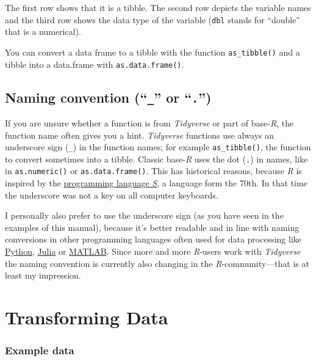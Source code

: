 \documentclass[
]{scrartcl}
\makeatletter
\newenvironment{kframe}{%
\medskip{}
\setlength{\fboxsep}{.8em}
 \def\at@end@of@kframe{}%
 \ifinner\ifhmode%
  \def\at@end@of@kframe{\end{minipage}}%
  \begin{minipage}{\columnwidth}%
 \fi\fi%
 \def\FrameCommand##1{\hskip\@totalleftmargin \hskip-\fboxsep
 \colorbox{shadecolor}{##1}\hskip-\fboxsep
     \hskip-\linewidth \hskip-\@totalleftmargin \hskip\columnwidth}%
 \MakeFramed {\advance\hsize-\width
   \@totalleftmargin\z@ \linewidth\hsize
   \@setminipage}}%
 {\par\unskip\endMakeFramed%
 \at@end@of@kframe}
\newenvironment{rmdblock}[1]
  {
  \begin{itemize}
  \renewcommand{\labelitemi}{
    \raisebox{-.7\height}[0pt][0pt]{
      {\setkeys{Gin}{width=3em,keepaspectratio}\texttt{[image: images/\#1]}}
    }
  }
  \setlength{\fboxsep}{1em}
  \begin{kframe}
  \item
  }
  {
  \end{kframe}
  \end{itemize}
  }
\newenvironment{geek}
    {\begin{rmdblock}{geek}}
    {\end{rmdblock}}
\makeatother
\begin{document}
The first row shows that it is a tibble. The second row depicts the variable names and the third row shows the data type of the variable (\texttt{dbl} stands for ``double'' that is a numerical).

\begin{geek}
You can convert a data frame to a tibble with the function
\texttt{as\_tibble()} and a tibble into a data.frame with
\texttt{as.data.frame()}.
\end{geek}

\subsection{\texorpdfstring{Naming convention (``\texttt{\_}'' or ``\texttt{.}'')}{Naming convention (``\_'' or ``.'')}}\label{naming-convention-_-or-.}

If you are unsure whether a function is from \emph{Tidyverse} or part of base-\emph{R}, the function name often gives you a hint. \emph{Tidyverse} functions use always an underscore sign (\texttt{\_}) in the function names; for example \texttt{as\_tibble()}, the function to convert sometimes into a tibble. Classic base-\emph{R} uses the dot (\texttt{.}) in names, like in \texttt{as.numeric()} or \texttt{as.data.frame()}. This has historical reasons, because \emph{R} is inspired by the \href{https://en.wikipedia.org/wiki/S_(programming_language)}{programming language \emph{S}}, a language form the 70th. In that time the underscore was not a key on all computer keyboards.

I personally also prefer to use the underscore sign (as you have seen in the examples of this manual), because it's better readable and in line with naming conversions in other programming languages often used for data processing like \href{https://www.python.org/}{Python}, \href{https://julialang.org/}{Julia} or \href{https://en.wikipedia.org/wiki/MATLAB}{MATLAB}. Since more and more \emph{R}-users work with \emph{Tidyverse} the naming convention is currently also changing in the \emph{R}-community---that is at least my impression.

\section{Transforming Data}\label{transformingdata}

\subsubsection*{Example data}\label{example-data}
\end{document}
